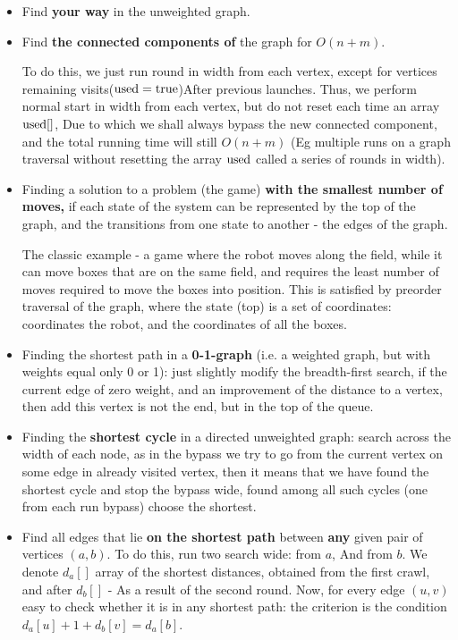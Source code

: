 \begin{itemize}

\item Find \textbf{your way} in the unweighted graph.

\item Find \textbf{the connected components of} the graph for $O (n + m)$.

To do this, we just run round in width from each vertex, except for vertices remaining visits($\rm used = true$)After previous launches. Thus, we perform normal start in width from each vertex, but do not reset each time an array $\rm used []$, Due to which we shall always bypass the new connected component, and the total running time will still $O (n + m)$ (Eg multiple runs on a graph traversal without resetting the array $\rm used$ called a series of rounds in width).

\item Finding a solution to a problem (the game) \textbf{with the smallest number of moves,} if each state of the system can be represented by the top of the graph, and the transitions from one state to another - the edges of the graph.

The classic example - a game where the robot moves along the field, while it can move boxes that are on the same field, and requires the least number of moves required to move the boxes into position. This is satisfied by preorder traversal of the graph, where the state (top) is a set of coordinates: coordinates the robot, and the coordinates of all the boxes.

\item Finding the shortest path in a \textbf{0-1-graph} (i.e. a weighted graph, but with weights equal only 0 or 1): just slightly modify the breadth-first search, if the current edge of zero weight, and an improvement of the distance to a vertex, then add this vertex is not the end, but in the top of the queue.

\item Finding the \textbf{shortest cycle} in a directed unweighted graph: search across the width of each node, as in the bypass we try to go from the current vertex on some edge in already visited vertex, then it means that we have found the shortest cycle and stop the bypass wide, found among all such cycles (one from each run bypass) choose the shortest.

\item Find all edges that lie \textbf{on the shortest path} between \textbf{any} given pair of vertices $(a, b)$. To do this, run two search wide: from $a$, And from $b$. We denote $d_a []$ array of the shortest distances, obtained from the first crawl, and after $d_b []$ - As a result of the second round. Now, for every edge $(u, v)$ easy to check whether it is in any shortest path: the criterion is the condition $d_a [u] + 1 + d_b [v] = d_a [b]$.


\end{itemize}
